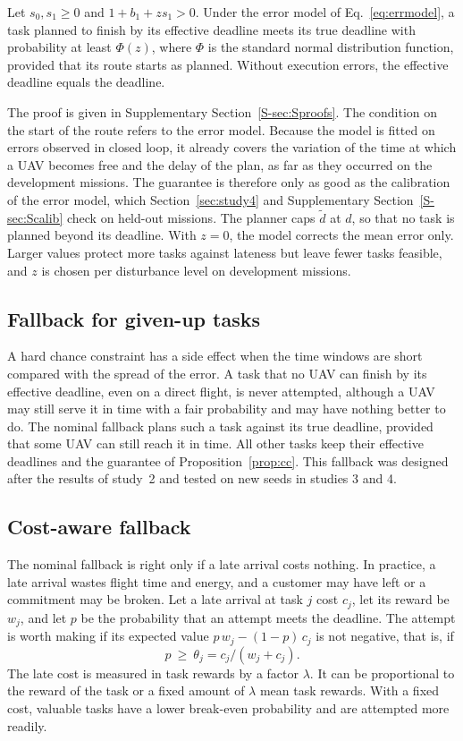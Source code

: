 \begin{prop}\label{prop:cc}
Let $s_0,s_1\ge0$ and $1+b_1+zs_1>0$. Under the error model of Eq.~\eqref{eq:errmodel}, a task planned to finish by its
effective deadline meets its true deadline with probability at least $\Phi(z)$, where $\Phi$ is the standard normal
distribution function, provided that its route starts as planned. Without execution errors, the effective deadline
equals the deadline.
\end{prop}

The proof is given in Supplementary Section~\ref{S-sec:Sproofs}. The condition on the start of the route refers to the
error model. Because the model is fitted on errors observed in closed loop, it already covers the variation of the time
at which a UAV becomes free and the delay of the plan, as far as they occurred on the development missions. The
guarantee is therefore only as good as the calibration of the error model, which Section~\ref{sec:study4} and Supplementary Section~\ref{S-sec:Scalib} check on held-out
missions. The planner caps $\tilde d$ at $d$, so that no task is planned beyond its deadline. With $z=0$, the model
corrects the mean error only. Larger values protect more tasks against lateness but leave fewer tasks feasible, and $z$
is chosen per disturbance level on development missions.

\subsection{Fallback for given-up tasks}\label{sec:fallback}
A hard chance constraint has a side effect when the time windows are short compared with the spread of the error. A
task that no UAV can finish by its effective deadline, even on a direct flight, is never attempted, although a UAV may
still serve it in time with a fair probability and may have nothing better to do. The nominal fallback plans such a
task against its true deadline, provided that some UAV can still reach it in time. All other tasks keep their effective
deadlines and the guarantee of Proposition~\ref{prop:cc}. This fallback was designed after the results of study~2 and
tested on new seeds in studies 3 and 4.

\subsection{Cost-aware fallback}\label{sec:costfb}
The nominal fallback is right only if a late arrival costs nothing. In practice, a late arrival wastes flight time and
energy, and a customer may have left or a commitment may be broken. Let a late arrival at task $j$ cost $c_j$, let its
reward be $w_j$, and let $p$ be the probability that an attempt meets the deadline. The attempt is worth making if its
expected value $p\,w_j-(1-p)\,c_j$ is not negative, that is, if
\begin{equation}\label{eq:theta}
p\ \ge\ \theta_j=c_j/(w_j+c_j).
\end{equation}
The late cost is measured in task rewards by a factor $\lambda$. It can be proportional to the reward of the task or a
fixed amount of $\lambda$ mean task rewards. With a fixed cost, valuable tasks have a lower break-even probability and
are attempted more readily.

